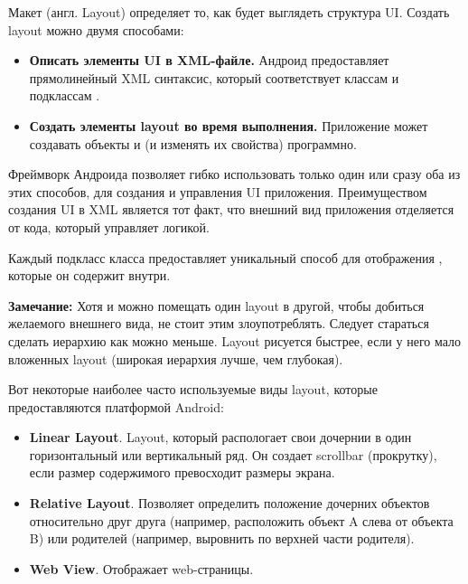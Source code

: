 

\newcommand{\AdapterView}{
  \href{https://developer.android.com/reference/android/widget/AdapterView.html}{AdapterView}
}

\newcommand{\Adapter}{
  \href{https://developer.android.com/reference/android/widget/Adapter.html}{Adapter}
}



Макет (англ. Layout) определяет то, как будет выглядеть структура UI. Создать
layout можно двумя способами:
\begin{itemize}
  \item \textbf{Описать элементы UI в XML-файле.} Андроид предоставляет
  прямолинейный XML синтаксис, который соответствует классам и подклассам
  \View.
  
  \item \textbf{Создать элементы layout во время выполнения.} Приложение может
  создавать объекты \View и \ViewGroup (и изменять их свойства) программно. 
\end{itemize}

Фреймворк Андроида позволяет гибко использовать только один или сразу оба из
этих способов, для создания и управления UI приложения.
Преимуществом создания UI в XML является тот факт, что внешний вид приложения
отделяется от кода, который управляет логикой.


Каждый подкласс класса \ViewGroup предоставляет уникальный способ для
отображения \View, которые он содержит внутри.

\textbf{Замечание:} Хотя и можно помещать один layout в другой, чтобы добиться
желаемого внешнего вида, не стоит этим злоупотреблять. Следует стараться
сделать иерархию как можно меньше. Layout рисуется быстрее, если у него мало
вложенных layout (широкая иерархия лучше, чем глубокая).

Вот некоторые наиболее часто используемые виды layout, которые предоставляются
платформой Android:
\begin{itemize}
  \item \textbf{Linear Layout}. Layout, который распологает свои дочернии \View
  в один горизонтальный или вертикальный ряд. Он создает scrollbar (прокрутку),
  если размер содержимого превосходит размеры экрана.
  
  \item \textbf{Relative Layout}. Позволяет определить положение дочерних
  объектов относительно друг друга (например, расположить объект A слева от
  объекта B) или родителей (например, выровнить по верхней части родителя).
  
  \item \textbf{Web View}. Отображает web-страницы.
\end{itemize}

